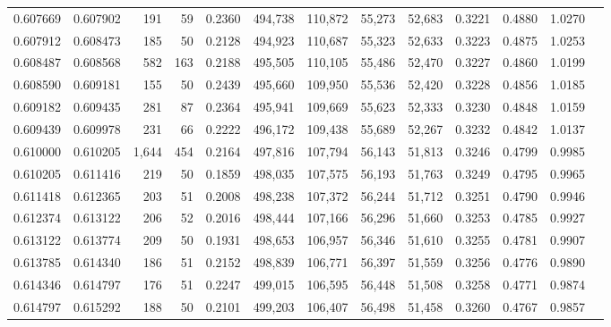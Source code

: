 \begin{tabular}{rrrrrrrrrrrrr}
0.607669 & 0.607902 &   191 &  59 &                                     0.2360 & 494,738 & 110,872 &  55,273 &  52,683 & 0.3221 & 0.4880 & 1.0270 \\
0.607912 & 0.608473 &   185 &  50 &                                     0.2128 & 494,923 & 110,687 &  55,323 &  52,633 & 0.3223 & 0.4875 & 1.0253 \\
0.608487 & 0.608568 &   582 & 163 &                                     0.2188 & 495,505 & 110,105 &  55,486 &  52,470 & 0.3227 & 0.4860 & 1.0199 \\
0.608590 & 0.609181 &   155 &  50 &                                     0.2439 & 495,660 & 109,950 &  55,536 &  52,420 & 0.3228 & 0.4856 & 1.0185 \\
0.609182 & 0.609435 &   281 &  87 &                                     0.2364 & 495,941 & 109,669 &  55,623 &  52,333 & 0.3230 & 0.4848 & 1.0159 \\
0.609439 & 0.609978 &   231 &  66 &                                     0.2222 & 496,172 & 109,438 &  55,689 &  52,267 & 0.3232 & 0.4842 & 1.0137 \\
0.610000 & 0.610205 & 1,644 & 454 &                                     0.2164 & 497,816 & 107,794 &  56,143 &  51,813 & 0.3246 & 0.4799 & 0.9985 \\
0.610205 & 0.611416 &   219 &  50 &                                     0.1859 & 498,035 & 107,575 &  56,193 &  51,763 & 0.3249 & 0.4795 & 0.9965 \\
0.611418 & 0.612365 &   203 &  51 &                                     0.2008 & 498,238 & 107,372 &  56,244 &  51,712 & 0.3251 & 0.4790 & 0.9946 \\
0.612374 & 0.613122 &   206 &  52 &                                     0.2016 & 498,444 & 107,166 &  56,296 &  51,660 & 0.3253 & 0.4785 & 0.9927 \\
0.613122 & 0.613774 &   209 &  50 &                                     0.1931 & 498,653 & 106,957 &  56,346 &  51,610 & 0.3255 & 0.4781 & 0.9907 \\
0.613785 & 0.614340 &   186 &  51 &                                     0.2152 & 498,839 & 106,771 &  56,397 &  51,559 & 0.3256 & 0.4776 & 0.9890 \\
0.614346 & 0.614797 &   176 &  51 &                                     0.2247 & 499,015 & 106,595 &  56,448 &  51,508 & 0.3258 & 0.4771 & 0.9874 \\
0.614797 & 0.615292 &   188 &  50 &                                     0.2101 & 499,203 & 106,407 &  56,498 &  51,458 & 0.3260 & 0.4767 & 0.9857 \\

\end{tabular}
